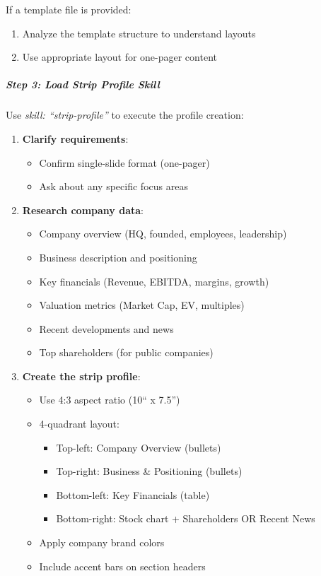 \documentclass[11pt]{article}
\begin{document}
If a template file is provided:

\begin{enumerate}[leftmargin=*,itemsep=2pt,topsep=2pt]
\item {} Analyze the template structure to understand layouts
\item {} Use appropriate layout for one-pager content
\end{enumerate}

\subparagraph{Step 3: Load Strip Profile Skill}\mbox{}\par

Use \emph{skill: ``strip-profile''} to execute the profile creation:


\begin{enumerate}[leftmargin=*,itemsep=2pt,topsep=2pt]
\item {} \textbf{Clarify requirements}:
\begin{itemize}[leftmargin=*,itemsep=2pt,topsep=2pt]
\item {} Confirm single-slide format (one-pager)
\item {} Ask about any specific focus areas
\end{itemize}
\item {} \textbf{Research company data}:
\begin{itemize}[leftmargin=*,itemsep=2pt,topsep=2pt]
\item {} Company overview (HQ, founded, employees, leadership)
\item {} Business description and positioning
\item {} Key financials (Revenue, EBITDA, margins, growth)
\item {} Valuation metrics (Market Cap, EV, multiples)
\item {} Recent developments and news
\item {} Top shareholders (for public companies)
\end{itemize}
\item {} \textbf{Create the strip profile}:
\begin{itemize}[leftmargin=*,itemsep=2pt,topsep=2pt]
\item {} Use 4:3 aspect ratio (10`` x 7.5'')
\item {} 4-quadrant layout:
\begin{itemize}[leftmargin=*,itemsep=2pt,topsep=2pt]
\item {} Top-left: Company Overview (bullets)
\item {} Top-right: Business \& Positioning (bullets)
\item {} Bottom-left: Key Financials (table)
\item {} Bottom-right: Stock chart + Shareholders OR Recent News
\end{itemize}
\item {} Apply company brand colors
\item {} Include accent bars on section headers
\end{itemize}
\end{enumerate}
\end{document}
